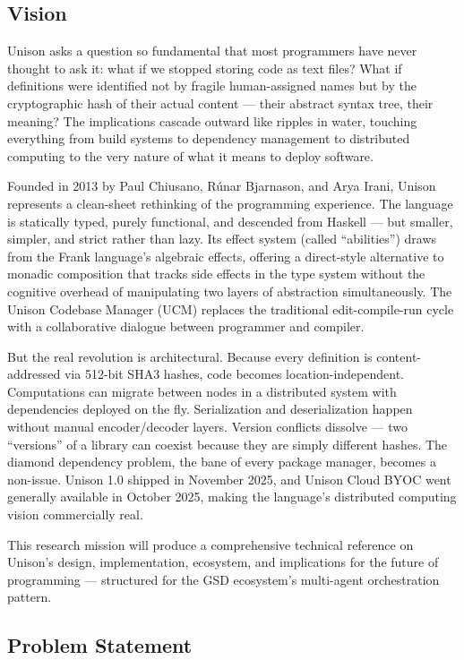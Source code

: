 \documentclass[11pt,letterpaper]{article}
\begin{document}
\subsection{Vision}

Unison asks a question so fundamental that most programmers have never thought to ask it: what if we stopped storing code as text files? What if definitions were identified not by fragile human-assigned names but by the cryptographic hash of their actual content --- their abstract syntax tree, their meaning? The implications cascade outward like ripples in water, touching everything from build systems to dependency management to distributed computing to the very nature of what it means to deploy software.

Founded in 2013 by Paul Chiusano, R\'{u}nar Bjarnason, and Arya Irani, Unison represents a clean-sheet rethinking of the programming experience. The language is statically typed, purely functional, and descended from Haskell --- but smaller, simpler, and strict rather than lazy. Its effect system (called ``abilities'') draws from the Frank language's algebraic effects, offering a direct-style alternative to monadic composition that tracks side effects in the type system without the cognitive overhead of manipulating two layers of abstraction simultaneously. The Unison Codebase Manager (UCM) replaces the traditional edit-compile-run cycle with a collaborative dialogue between programmer and compiler.

But the real revolution is architectural. Because every definition is content-addressed via 512-bit SHA3 hashes, code becomes location-independent. Computations can migrate between nodes in a distributed system with dependencies deployed on the fly. Serialization and deserialization happen without manual encoder/decoder layers. Version conflicts dissolve --- two ``versions'' of a library can coexist because they are simply different hashes. The diamond dependency problem, the bane of every package manager, becomes a non-issue. Unison 1.0 shipped in November 2025, and Unison Cloud BYOC went generally available in October 2025, making the language's distributed computing vision commercially real.

This research mission will produce a comprehensive technical reference on Unison's design, implementation, ecosystem, and implications for the future of programming --- structured for the GSD ecosystem's multi-agent orchestration pattern.

\subsection{Problem Statement}
\end{document}

